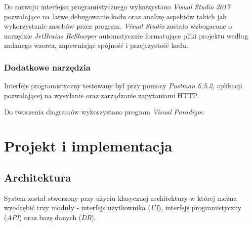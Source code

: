 \documentclass[eng,printmode,openany]{mgr}
\begin{document}
	Do rozwoju interfejsu programistycznego wykorzystano \textit{Visual Studio 2017} pozwalające na łatwe debugowanie kodu oraz analizę aspektów takich jak wykorzystanie zasobów przez program. \textit{Visual Studio} zostało wzbogacone o narzędzie \textit{JetBrains ReSharper} automatycznie formatujące pliki projektu według zadanego wzorca, zapewniając spójność i przejrzystość kodu.
	\subsection{Dodatkowe narzędzia}
	Interfejs programistyczny testowany był przy pomocy \textit{Postman 6.5.2}, aplikacji pozwalającej na wysyłanie oraz zarządzanie zapytaniami HTTP.
	
	Do tworzenia diagramów wykorzystano program \textit{Visual Paradigm}.
	
	\newpage
	\chapter{Projekt i implementacja}
	\section{Architektura}
	System został stworzony przy użyciu klasycznej architektury w której można wyodrębić trzy moduły - interfejs użytkownika (\textit{UI}), interfejs programistyczny (\textit{API}) oraz bazę danych (\textit{DB}). 
	
\end{document}
